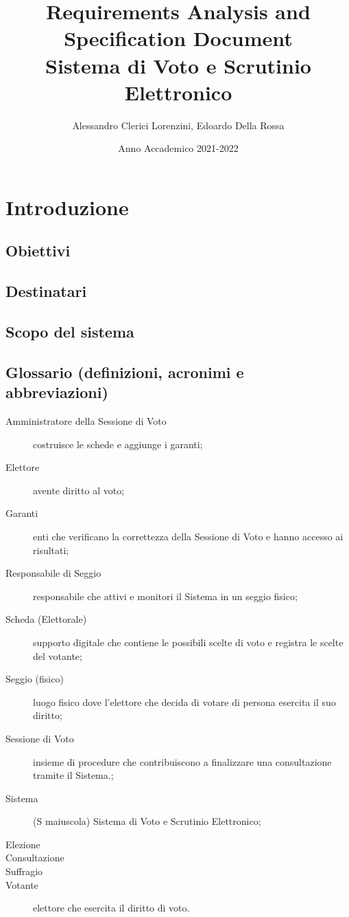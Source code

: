 \documentclass{report}
\begin{document}
\title{Requirements Analysis and Specification Document \\
\large Sistema di Voto e Scrutinio Elettronico}
\author{Alessandro Clerici Lorenzini, Edoardo Della Rossa}
\date{Anno Accademico 2021-2022}
\maketitle

\tableofcontents

\chapter{Introduzione}
\section{Obiettivi}
\section{Destinatari}
\section{Scopo del sistema}
\section{Glossario (definizioni, acronimi e abbreviazioni)}
\begin{description}
	\item[Amministratore della Sessione di Voto] costruisce le schede e aggiunge i garanti;
	\item[Elettore] avente diritto al voto;
	\item[Garanti] enti che verificano la correttezza della Sessione di Voto e hanno accesso ai risultati;
	\item[Responsabile di Seggio] responsabile che attivi e monitori il Sistema in un seggio fisico;
	\item[Scheda (Elettorale)] supporto digitale che contiene le possibili scelte di voto e registra le scelte del votante;
	\item[Seggio (fisico)] luogo fisico dove l'elettore che decida di votare di persona esercita il suo diritto;
	\item[Sessione di Voto] insieme di procedure che contribuiscono a finalizzare una consultazione tramite il Sistema.;
	\item[Sistema] (S maiuscola) Sistema di Voto e Scrutinio Elettronico;
	\item[Elezione]
	\item[Consultazione]
	\item[Suffragio]
	\item[Votante] elettore che esercita il diritto di voto.
\end{description}
\end{document}
